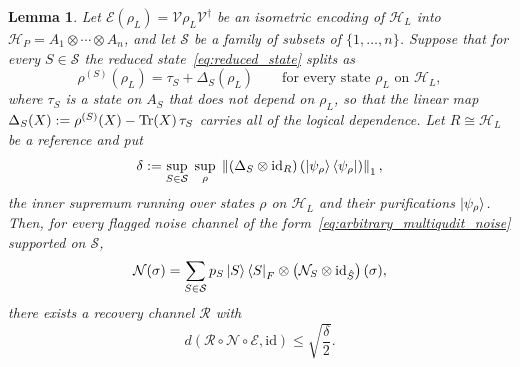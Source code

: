 \documentclass[10pt,twocolumn,superscriptaddress,aps,amsmath,amssymb,citeautoscript,floatfix,prx]{revtex4-2}
\theoremstyle{plain}
\theoremstyle{plain}
\theoremstyle{plain}
\theoremstyle{plain}
\theoremstyle{plain}
\theoremstyle{plain}
\theoremstyle{plain}
\newtheorem{smlemma}[smtheorem]{Lemma}
\theoremstyle{definition}
\theoremstyle{plain}
\begin{document}
\begin{appendix}
\begin{smlemma}\label{lem:arb_noise_from_leakage}
    Let $\mathcal E(\rho_L)=\mathcal{V}\rho_L\mathcal{V}^\dagger$ be an isometric encoding of $\mathcal H_L$ into $\mathcal H_P=A_1\otimes\cdots\otimes A_n$, 
    and let $\mathcal S$ be a family of subsets of $\{1,\ldots,n\}$. 
    Suppose that for every $S\in\mathcal S$ the reduced state~\eqref{eq:reduced_state} splits as
    \begin{equation}
    \label{eq:leakage-splitting}
        \rho^{(S)}(\rho_L)=\tau_S+\Delta_S(\rho_L)
        \qquad\text{for every state }\rho_L\text{ on }\mathcal H_L,
    \end{equation}
    where $\tau_S$ is a state on $A_S$ that does not depend on $\rho_L$, so that the linear map $\Delta_S(X):=\rho^{(S)}(X)-\Tr(X)\,\tau_S$ carries all of the logical dependence. 
    Let $R\cong\mathcal H_L$ be a reference and put
    \begin{equation}
    \label{eq:uniform-leakage}
        \delta
        :=
        \sup_{S\in\mathcal S}\;
        \sup_{\rho}\;
        \left\|
            (\Delta_S\otimes\mathrm{id}_R)
            \left(\ket{\psi_\rho}\bra{\psi_\rho}\right)
        \right\|_1,
    \end{equation}
    the inner supremum running over states $\rho$ on $\mathcal H_L$ and their purifications $\ket{\psi_\rho}$. 
    Then, for every flagged noise channel of the form~\eqref{eq:arbitrary_multiqudit_noise} supported on $\mathcal S$,
    \[
        \mathcal N(\sigma)
        =
        \sum_{S\in\mathcal S}
        p_S
        \ket S\bra S_F
        \otimes
        \left(\mathcal N_S\otimes\mathrm{id}_{\hat S}\right)(\sigma),
    \]
    there exists a recovery channel $\mathcal R$ with
    \begin{equation}
    \label{eq:arb-noise-bound}
        d(\mathcal R\circ\mathcal N\circ\mathcal E,\mathrm{id})
        \le
        \sqrt{\frac\delta2}.
    \end{equation}
\end{smlemma}


\end{appendix}
\end{document}
